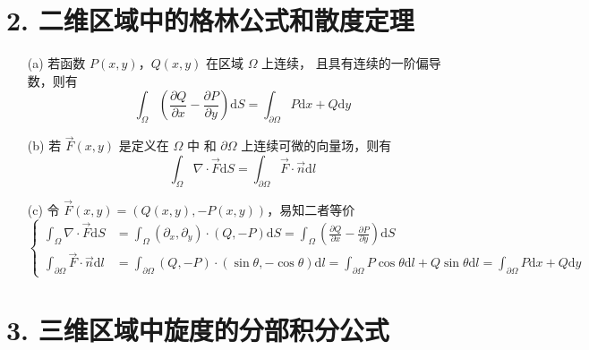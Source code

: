 \documentclass[a4paper]{article}
\begin{document}
\section*{2. 二维区域中的格林公式和散度定理}

\begin{enumerate}
    \item[(a)] 若函数 $P(x,y)$，$Q(x,y)$ 在区域 $\Omega$ 上连续，
    且具有连续的一阶偏导数，则有
    \begin{equation}
        \int_{\Omega} \left(\frac{\partial Q}{\partial x}
        -\frac{\partial P}{\partial y}\right) \text{d}S
        = \int_{\partial \Omega} P\text{d}x + Q\text{d}y
    \end{equation}
    \item[(b)] 若 $\vec{F}(x,y)$ 是定义在 $\Omega$ 中
    和 $\partial \Omega$ 上连续可微的向量场，则有
    \begin{equation}
        \int_{\Omega} \nabla \cdot \vec{F} \text{d}S
        = \int_{\partial \Omega} \vec{F} \cdot \vec{n} \text{d}l
    \end{equation}
    \item[(c)] 令 $\vec{F}(x,y) = (Q(x,y), -P(x,y))$，易知二者等价
    \begin{equation}
        \left\{
            \begin{aligned}
                \int_{\Omega} \nabla \cdot \vec{F} \text{d}S
                    &=\int_{\Omega} (\partial_x, \partial_y) \cdot (Q, -P) \text{d}S
                    =\int_{\Omega} \left(\frac{\partial Q}{\partial x}
                    -\frac{\partial P}{\partial y}\right) \text{d}S\\
                \int_{\partial \Omega} \vec{F} \cdot \vec{n} \text{d}l
                    &=\int_{\partial \Omega} (Q,-P) \cdot (\sin \theta, -\cos \theta) \text{d}l
                    =\int_{\partial \Omega} P\cos \theta\text{d}l + Q\sin \theta\text{d}l
                    =\int_{\partial \Omega} P\text{d}x + Q\text{d}y
            \end{aligned}
        \right.
    \end{equation}
\end{enumerate}

\section*{3. 三维区域中旋度的分部积分公式}
\end{document}
